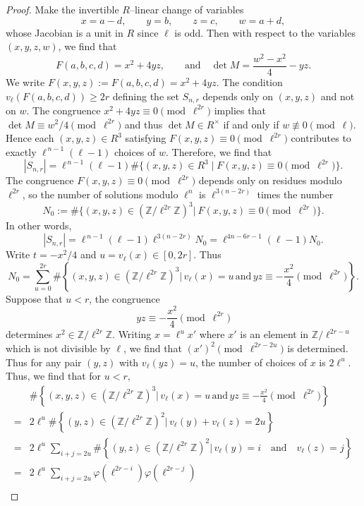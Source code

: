 \documentclass[table]{amsart}
\newcommand{\Z}{\mathbb{Z}}
\numberwithin{equation}{section}
\begin{document}
\begin{proof}
Make the invertible $R$–linear change of variables
\[
x=a-d,\qquad y=b,\qquad z=c,\qquad w=a+d,
\]
whose Jacobian is a unit in $R$ since $\ell$ is odd. Then with respect to the variables $(x,y,z,w)$, we find that
\[
F(a,b,c,d)=x^2+4yz,
\qquad\text{and}\quad
\det M=\frac{w^2-x^2}{4}-yz.
\]
We write $F(x,y,z):=F(a,b,c,d)=x^2+4yz$. The condition $v_\ell\left(F(a,b,c,d)\right)\ge2r$ defining the set $S_{n,r}$ depends only on $(x,y,z)$ and not on $w$. The congruence $x^2+4yz\equiv0\pmod{\ell^{2r}}$ implies that $\det M\equiv w^2/4\pmod{\ell^{2r}}$ and thus $\det M\in R^\times$ if and only if $w\not\equiv0\pmod\ell$.  Hence each
$(x,y,z)\in R^3$ satisfying $F(x,y,z)\equiv 0\pmod{\ell^{2r}}$ contributes to exactly $\ell^{\,n-1}(\ell-1)$ choices of $w$. Therefore, we find that
\[|S_{n,r}|=\ell^{\,n-1}(\ell-1)\#\{(x,y,z)\in R^3\mid F(x,y,z)\equiv 0\pmod{\ell^{2r}}\}.\]
\noindent The congruence $F(x,y,z)\equiv0\pmod{\ell^{2r}}$ depends only on residues
modulo $\ell^{2r}$, so the number of solutions modulo $\ell^n$ is
$\ell^{3(n-2r)}$ times the number
\[
N_0:=\#\{(x,y,z)\in(\Z/\ell^{2r}\Z)^3|\ F(x,y,z)\equiv0\pmod{\ell^{2r}}\}.
\] 
\noindent In other words,
\[|S_{n,r}|=\ell^{\,n-1}(\ell-1)\ell^{3(n-2r)} N_0=\ell^{4n-6r-1}(\ell-1)N_0.\]
\noindent Write $t=-x^2/4$ and $u=v_\ell(x)\in [0,2r]$. Thus
\begin{equation}\label{N_0 eqn}N_0=\sum_{u=0}^{2r} \#\left\{(x,y,z)\in(\Z/\ell^{2r}\Z)^3|\, v_\ell(x)=u\,\text{and}\, yz\equiv -\frac{x^2}{4}\pmod{\ell^{2r}}\right\}.\end{equation}
Suppose that $u<r$, the congruence 
\[yz\equiv -\frac{x^2}{4}\pmod{\ell^{2r}}\]determines $x^2\in \Z/\ell^{2r}\Z$. Writing $x=\ell^ux'$ where $x'$ is an element in $\Z/\ell^{2r-u}$ which is not divisible by $\ell$, we find that $(x')^2\pmod{\ell^{2r-2u}}$ is determined. Thus for any pair $(y,z)$ with $v_\ell(yz)=u$, the number of choices of $x$ is $2\ell^u$. Thus, we find that for $u<r$,
\begin{equation}\label{u<r eqn}\begin{split}&\#\left\{(x,y,z)\in(\Z/\ell^{2r}\Z)^3|\, v_\ell(x)=u\,\text{and}\, yz\equiv -\frac{x^2}{4}\pmod{\ell^{2r}}\right\}\\
=&2\ell^u\#\left\{(y,z)\in(\Z/\ell^{2r}\Z)^2|\, v_\ell(y)+v_\ell(z)=2u\right\}\\
=& 2\ell^u\sum_{i+j=2u} \#\left\{(y,z)\in(\Z/\ell^{2r}\Z)^2|\, v_\ell(y)=i\quad\text{and}\quad v_\ell(z)=j\right\}\\
=& 2\ell^u\sum_{i+j=2u} \varphi(\ell^{2r-i})\varphi(\ell^{2r-j})\\

\end{split}
\end{equation}
\end{proof}
\end{document}
